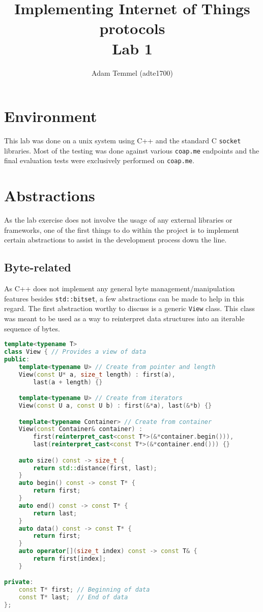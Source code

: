\documentclass[a4paper, titlepage,12pt]{article}
\title{Implementing Internet of Things protocols\\
Lab 1}
\author{Adam Temmel (adte1700)}
\begin{document}
	\maketitle
	\section{Environment}
	This lab was done on a unix system using C++ and the standard C \lstinline{socket} libraries\cite{socket}. Most of the testing was done against various \lstinline{coap.me} endpoints and the final evaluation tests were exclusively performed on \lstinline{coap.me}.
	\section{Abstractions}
	As the lab exercise does not involve the usage of any external libraries or frameworks, one of the first things to do within the project is to implement certain abstractions to assist in the development process down the line. 
		\subsection{Byte-related}
		As C++ does not implement any general byte management/manipulation features besides \lstinline{std::bitset}, a few abstractions can be made to help in this regard. The first abstraction worthy to discuss is a generic \lstinline{View} class. This class was meant to be used as a way to reinterpret data structures into an iterable sequence of bytes.

		\begin{lstlisting}[language=C++]
template<typename T>
class View { // Provides a view of data
public:
	template<typename U> // Create from pointer and length
	View(const U* a, size_t length) : first(a), 
		last(a + length) {}

	template<typename U> // Create from iterators
	View(const U a, const U b) : first(&*a), last(&*b) {}

	template<typename Container> // Create from container
	View(const Container& container) : 
		first(reinterpret_cast<const T*>(&*container.begin())), 
		last(reinterpret_cast<const T*>(&*container.end())) {}

	auto size() const -> size_t {
		return std::distance(first, last);
	}
	auto begin() const -> const T* {
		return first;
	}
	auto end() const -> const T* {
		return last;
	}
	auto data() const -> const T* {
		return first;
	}
	auto operator[](size_t index) const -> const T& {
		return first[index];
	}

private:
	const T* first;	// Beginning of data
	const T* last;	// End of data
};
		\end{lstlisting}
\end{document}
